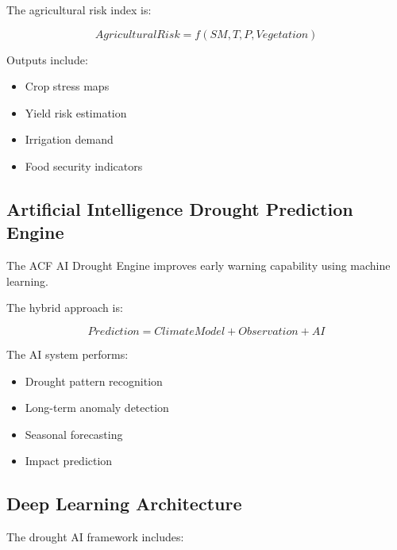 The agricultural risk index is:

\[
AgriculturalRisk=
f(SM,T,P,Vegetation)
\]


Outputs include:

\begin{itemize}

\item Crop stress maps

\item Yield risk estimation

\item Irrigation demand

\item Food security indicators

\end{itemize}



\subsection{Artificial Intelligence Drought Prediction Engine}

The ACF AI Drought Engine improves early warning capability using
machine learning.

The hybrid approach is:

\[
Prediction=
ClimateModel+
Observation+
AI
\]


The AI system performs:

\begin{itemize}

\item Drought pattern recognition

\item Long-term anomaly detection

\item Seasonal forecasting

\item Impact prediction

\end{itemize}



\subsection{Deep Learning Architecture}

The drought AI framework includes:

